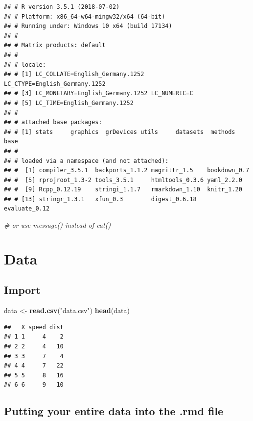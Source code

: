 \documentclass[12pt,]{article}
\newenvironment{Shaded}{\begin{snugshade}}{\end{snugshade}}
\newcommand{\KeywordTok}[1]{\textcolor[rgb]{0.13,0.29,0.53}{\textbf{#1}}}
\newcommand{\StringTok}[1]{\textcolor[rgb]{0.31,0.60,0.02}{#1}}
\newcommand{\CommentTok}[1]{\textcolor[rgb]{0.56,0.35,0.01}{\textit{#1}}}
\newcommand{\NormalTok}[1]{#1}
\theoremstyle{definition}
\theoremstyle{definition}
\theoremstyle{definition}
\theoremstyle{remark}
\begin{document}
\begin{verbatim}
## # R version 3.5.1 (2018-07-02) 
## # Platform: x86_64-w64-mingw32/x64 (64-bit) 
## # Running under: Windows 10 x64 (build 17134) 
## #  
## # Matrix products: default 
## #  
## # locale: 
## # [1] LC_COLLATE=English_Germany.1252  LC_CTYPE=English_Germany.1252    
## # [3] LC_MONETARY=English_Germany.1252 LC_NUMERIC=C                     
## # [5] LC_TIME=English_Germany.1252     
## #  
## # attached base packages: 
## # [1] stats     graphics  grDevices utils     datasets  methods   base      
## #  
## # loaded via a namespace (and not attached): 
## #  [1] compiler_3.5.1  backports_1.1.2 magrittr_1.5    bookdown_0.7    
## #  [5] rprojroot_1.3-2 tools_3.5.1     htmltools_0.3.6 yaml_2.2.0      
## #  [9] Rcpp_0.12.19    stringi_1.1.7   rmarkdown_1.10  knitr_1.20      
## # [13] stringr_1.3.1   xfun_0.3        digest_0.6.18   evaluate_0.12
\end{verbatim}

\begin{Shaded}
\begin{Highlighting}[]
  \CommentTok{# or use message() instead of cat()}
\end{Highlighting}
\end{Shaded}

\section{Data}\label{data}

\subsection{Import}\label{import}

\begin{Shaded}
\begin{Highlighting}[]
\NormalTok{data <-}\StringTok{ }\KeywordTok{read.csv}\NormalTok{(}\StringTok{"data.csv"}\NormalTok{)}
\KeywordTok{head}\NormalTok{(data)}
\end{Highlighting}
\end{Shaded}

\begin{verbatim}
##   X speed dist
## 1 1     4    2
## 2 2     4   10
## 3 3     7    4
## 4 4     7   22
## 5 5     8   16
## 6 6     9   10
\end{verbatim}

\subsection{Putting your entire data into the .rmd
file}\label{putting-your-entire-data-into-the-.rmd-file}
\end{document}
